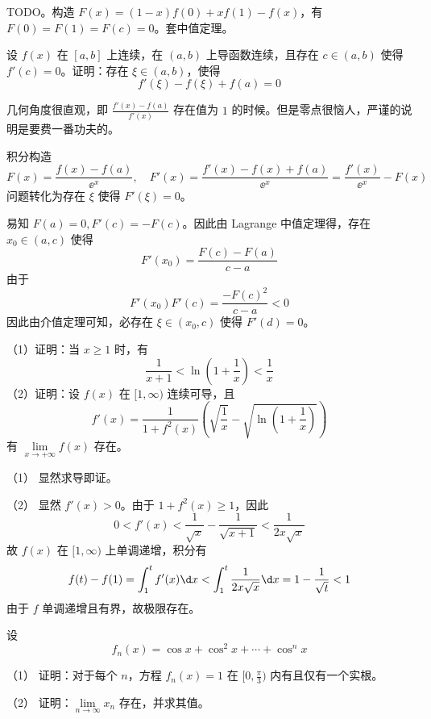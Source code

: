 \begin{solution}
	TODO。构造 $F(x) = (1-x)f(0) + xf(1) - f(x)$，有 $F(0) = F(1) = F(c) = 0$。套中值定理。
\end{solution}

\begin{problem}[000016]
设 $f(x)$ 在 $[a, b]$ 上连续，在 $(a, b)$ 上导函数连续，且存在 $c \in (a, b)$ 使得 $f'(c) = 0$。证明：存在 $\xi \in (a, b)$，使得
\[ f'(\xi) - f(\xi) + f(a) = 0 \]
\end{problem}

\begin{solution}
	几何角度很直观，即 $\frac{f'(x) - f(a)}{f'(x)}$ 存在值为 $1$ 的时候。但是零点很恼人，严谨的说明是要费一番功夫的。

	积分构造
	\[ F(x) = \frac{f(x) - f(a)}{\ee^x}, \quad F'(x) = \frac{f'(x) - f(x) + f(a)}{\ee^x} = \frac{f'(x)}{\ee^x} - F(x) \]
	问题转化为存在 $\xi$ 使得 $F'(\xi) = 0$。

	易知 $F(a) = 0, F'(c) = -F(c)$。因此由 Lagrange 中值定理得，存在 $x_0 \in (a, c)$ 使得
	\[ F'(x_0) = \frac{F(c) - F(a)}{c - a} \]
	由于
	\[ F'(x_0) F'(c) = \frac{-F(c)^2}{c- a} < 0 \]
	因此由介值定理可知，必存在 $\xi \in (x_0, c)$ 使得 $F'(d) = 0$。
\end{solution}

\begin{problem}[000018]
（1）证明：当 $x \geqslant 1$ 时，有
\[ \frac{1}{x+1} < \ln\left(1 + \frac{1}{x}\right) < \frac{1}{x} \]
（2）证明：设 $f(x)$ 在 $[1, \infty)$ 连续可导，且
\[ f'(x) = \frac{1}{1 + f^2(x)} \left( \sqrt{\frac{1}{x}} - \sqrt{\ln\left(1 + \frac{1}{x}\right)} \right) \]
有 $\lim\limits_{x \to +\infty} f(x)$ 存在。
\end{problem}

\begin{solution}
	（1） 显然求导即证。

	（2） 显然 $f'(x) > 0$。由于 $1 + f^2(x) \geqslant 1$，因此
	\[ 0 < f'(x) < \frac{1}{\sqrt{x}} - \frac{1}{\sqrt{x+1}} < \frac{1}{2 x \sqrt{x}} \]
	故 $f(x)$ 在 $[1, \infty)$ 上单调递增，积分有
	\[ f(t) - f(1) = \int_{1}^{t} f'(x) \d x < \int_{1}^{t} \frac{1}{2 x \sqrt{x}} \d x = 1 - \frac{1}{\sqrt{t}} < 1 \]
	由于 $f$ 单调递增且有界，故极限存在。
\end{solution}

\begin{problem}[000020]
设
\[ f_n(x) = \cos x + \cos^2 x + \cdots + \cos^n x \]

（1） 证明：对于每个 $n$，方程 $f_n(x) = 1$ 在 $[0, \frac{\pi}{3})$ 内有且仅有一个实根。

（2） 证明：$\lim\limits_{n \to \infty} x_n$ 存在，并求其值。
\end{problem}

